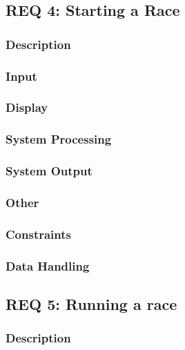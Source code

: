 \documentclass[a4paper, 11pt]{article} %
\begin{document}
\newpage

\subsection{REQ 4: Starting a Race}

\subsubsection{Description}

\subsubsection{Input}

\subsubsection{Display}

\subsubsection{System Processing}

\subsubsection{System Output}

\subsubsection{Other}

\subsubsection{Constraints}

\subsubsection{Data Handling}

\newpage

\subsection{REQ 5: Running a race}

\subsubsection{Description}
\end{document}
